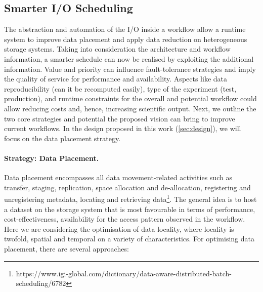\documentclass{superfri}
\begin{document}


\subsection{Smarter I/O Scheduling}

The abstraction and automation of the I/O inside a workflow allow a runtime system to improve data placement and apply data reduction on heterogeneous storage systems.
Taking into consideration the architecture and workflow information, a smarter schedule can now be realised by exploiting the additional information.
Value and priority can influence fault-tolerance strategies and imply the quality of service for performance and availability.
Aspects like data reproducibility (can it be recomputed easily), type of the experiment (test, production), and runtime constraints for the overall and potential workflow could allow reducing costs and, hence, increasing scientific output.
Next, we outline the two core strategies and potential the proposed vision can bring to improve current workflows.
In the design proposed in this work (\cref{sec:design}), we will focus on the data placement strategy.


\paragraph{Strategy: Data Placement.}

Data placement encompasses all data movement-related activities such as transfer, staging, replication, space allocation and de-allocation, registering and unregistering metadata, locating and retrieving data\footnote{https://www.igi-global.com/dictionary/data-aware-distributed-batch-scheduling/6782}.
The general idea is to host a dataset on the storage system that is most favourable in terms of performance, cost-effectiveness, availability for the access pattern observed in the workflow.
Here we are considering the optimisation of data locality, where locality is twofold, spatial and temporal on a variety of characteristics.
For optimising data placement, there are several approaches:%
\end{document}
